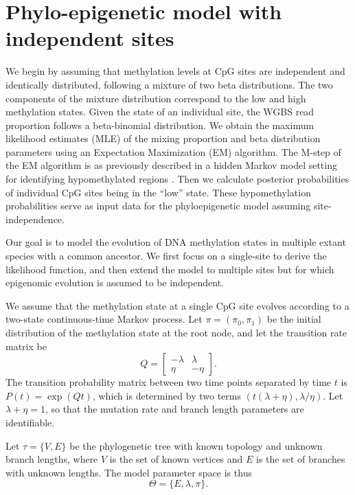 \documentclass[11pt]{article}
\theoremstyle{theorem}
\theoremstyle{proposition}
\begin{document}
\section{Phylo-epigenetic model with independent sites}
\label{sec:indep}

We begin by assuming that methylation levels at CpG sites are
independent and identically distributed, following a mixture of two
beta distributions. The two components of the mixture distribution
correspond to the low and high methylation
states. Given the state of an individual site, the WGBS read
proportion follows a beta-binomial
distribution. We obtain the maximum likelihood estimates (MLE) of the
mixing proportion and beta distribution parameters using an
Expectation Maximization (EM) algorithm. The M-step of the EM
algorithm is as previously described in a hidden Markov model setting
for identifying hypomethylated regions \citep{molaro2011sperm}. Then
we calculate posterior probabilities of individual CpG sites being in
the ``low'' state. These hypomethylation probabilities serve as input
data for the phyloepigenetic model assuming site-independence.

Our goal is to model the evolution of DNA methylation states in
multiple extant species with a common ancestor. We first focus on a
single-site to derive the likelihood function, and then extend the
model to multiple sites but for which epigenomic evolution is assumed
to be independent.

We assume that the methylation state at a single CpG site evolves
according to a two-state continuous-time Markov process. Let
$\pi=(\pi_0, \pi_1)$ be the initial distribution of the methylation
state at the root node, and let the transition rate matrix be
\[
Q=\begin{bmatrix}
-\lambda & \lambda\\
    \eta & -\eta
\end{bmatrix}.
\]
The transition probability matrix between two time points separated by
time $t$ is $P(t) = \exp(Qt)$, which is determined by two terms
$(t(\lambda + \eta), \lambda/\eta)$. Let $\lambda+\eta = 1$, so that
the mutation rate and branch length parameters are identifiable.

Let $\tau=\{V, E\}$ be the phylogenetic tree with known topology and
unknown branch lengths, where $V$ is the set of known vertices and $E$
is the set of branches with unknown lengths. The model parameter space
is thus
\[
\Theta=\{E,\lambda, \pi\}.
\]
\end{document}
